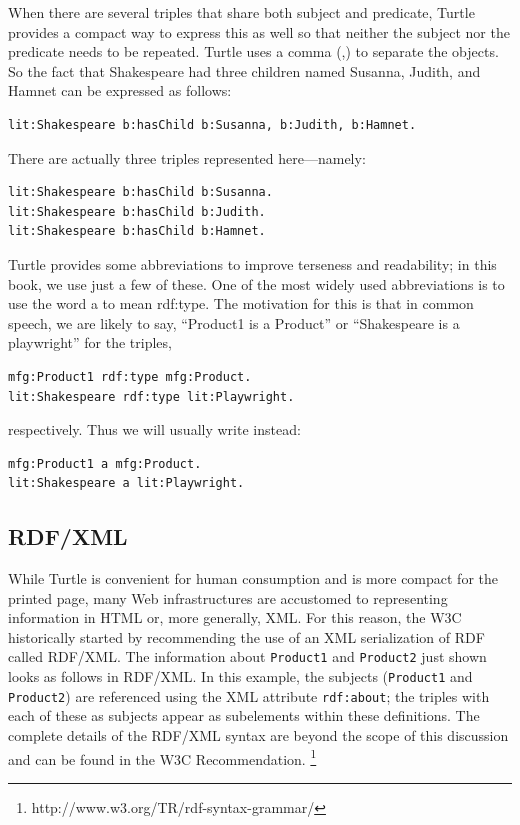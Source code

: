 When there are several triples that share both subject and predicate,
Turtle provides a compact way to express this as well so that neither
the subject nor the predicate needs to be repeated. Turtle uses a comma
(,) to separate the objects. So the fact that Shakespeare had three
children named Susanna, Judith, and Hamnet can be expressed as follows:

\begin{lstlisting}
lit:Shakespeare b:hasChild b:Susanna, b:Judith, b:Hamnet.
\end{lstlisting}

There are actually three triples represented here---namely:

\begin{lstlisting}
lit:Shakespeare b:hasChild b:Susanna. 
lit:Shakespeare b:hasChild b:Judith. 
lit:Shakespeare b:hasChild b:Hamnet.
\end{lstlisting}

Turtle provides some abbreviations to improve terseness and readability;
in this book, we use just a few of these. One of the most widely used
abbreviations is to use the word a to mean rdf:type. The motivation for
this is that in common speech, we are likely to say, ``Product1 is a
Product'' or ``Shakespeare is a playwright'' for the triples,

\begin{lstlisting}
mfg:Product1 rdf:type mfg:Product. 
lit:Shakespeare rdf:type lit:Playwright.
\end{lstlisting}

respectively. Thus we will usually write instead:

\begin{lstlisting}
mfg:Product1 a mfg:Product. 
lit:Shakespeare a lit:Playwright.
\end{lstlisting}

\subsection{RDF/XML}

While Turtle is convenient for human consumption and is more compact for
the printed page, many Web infrastructures are accustomed to
representing information in HTML or, more generally, XML. For this
reason, the W3C historically started by recommending the use of an XML
serialization of RDF called RDF/XML. The information about \texttt{Product1} and
\texttt{Product2} just shown looks as follows in RDF/XML. In this example, the
subjects (\texttt{Product1} and \texttt{Product2}) are referenced using the XML attribute
\texttt{rdf:about}; the triples with each of these as subjects appear as
subelements within these definitions. The complete details of the
RDF/XML syntax are beyond the scope of this discussion and can be found in the W3C Recommendation. \footnote{http://www.w3.org/TR/rdf-syntax-grammar/}

